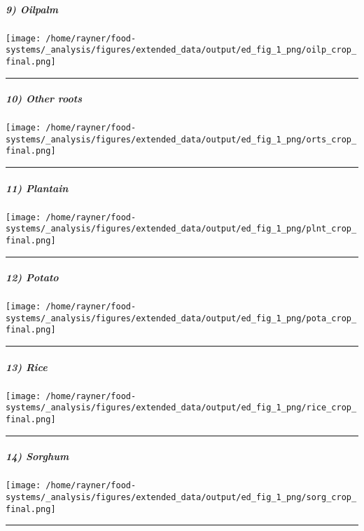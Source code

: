 \documentclass[
]{article}
\begin{document}
\hypertarget{oilpalm}{%
\subparagraph{9) Oilpalm}\label{oilpalm}}

\texttt{[image: /home/rayner/food-systems/\_analysis/figures/extended\_data/output/ed\_fig\_1\_png/oilp\_crop\_final.png]}

\begin{center}\rule{0.5\linewidth}{0.5pt}\end{center}

\hypertarget{other-roots}{%
\subparagraph{10) Other roots}\label{other-roots}}

\texttt{[image: /home/rayner/food-systems/\_analysis/figures/extended\_data/output/ed\_fig\_1\_png/orts\_crop\_final.png]}

\begin{center}\rule{0.5\linewidth}{0.5pt}\end{center}

\hypertarget{plantain}{%
\subparagraph{11) Plantain}\label{plantain}}

\texttt{[image: /home/rayner/food-systems/\_analysis/figures/extended\_data/output/ed\_fig\_1\_png/plnt\_crop\_final.png]}

\begin{center}\rule{0.5\linewidth}{0.5pt}\end{center}

\hypertarget{potato}{%
\subparagraph{12) Potato}\label{potato}}

\texttt{[image: /home/rayner/food-systems/\_analysis/figures/extended\_data/output/ed\_fig\_1\_png/pota\_crop\_final.png]}

\begin{center}\rule{0.5\linewidth}{0.5pt}\end{center}

\hypertarget{rice}{%
\subparagraph{13) Rice}\label{rice}}

\texttt{[image: /home/rayner/food-systems/\_analysis/figures/extended\_data/output/ed\_fig\_1\_png/rice\_crop\_final.png]}

\begin{center}\rule{0.5\linewidth}{0.5pt}\end{center}

\hypertarget{sorghum}{%
\subparagraph{14) Sorghum}\label{sorghum}}

\texttt{[image: /home/rayner/food-systems/\_analysis/figures/extended\_data/output/ed\_fig\_1\_png/sorg\_crop\_final.png]}

\begin{center}\rule{0.5\linewidth}{0.5pt}\end{center}
\end{document}

